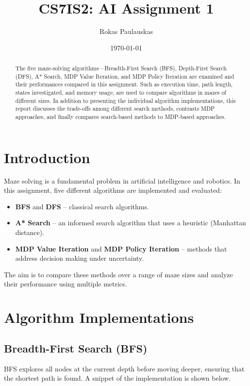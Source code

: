 \documentclass{article}
\title{CS7IS2: AI Assignment 1}
\author{Rokas Paulauskas}
\date{\today}
\begin{document}
\maketitle

\begin{abstract}
    The five maze-solving algorithms—Breadth-First Search (BFS), Depth-First Search (DFS), A* Search, MDP Value Iteration, and MDP Policy Iteration are examined and their performances compared in this assignment. Such as execution time, path length, states investigated, and memory usage, are used to compare algorithms in mazes of different sizes. In addition to presenting the individual algorithm implementations, this report discusses the trade-offs among different search methods, contrasts MDP approaches, and finally compares search-based methods to MDP-based approaches.
\end{abstract}

\section{Introduction}
Maze solving is a fundamental problem in artificial intelligence and robotics. In this assignment, five different algorithms are implemented and evaluated:
\begin{itemize}
    \item \textbf{BFS} and \textbf{DFS} – classical search algorithms.
    \item \textbf{A* Search} – an informed search algorithm that uses a heuristic (Manhattan distance).
    \item \textbf{MDP Value Iteration} and \textbf{MDP Policy Iteration} – methods that address decision making under uncertainty.
\end{itemize}
The aim is to compare these methods over a range of maze sizes and analyze their performance using multiple metrics.

\section{Algorithm Implementations}

\subsection{Breadth-First Search (BFS)}
BFS explores all nodes at the current depth before moving deeper, ensuring that the shortest path is found. A snippet of the implementation is shown below.
\end{document}
